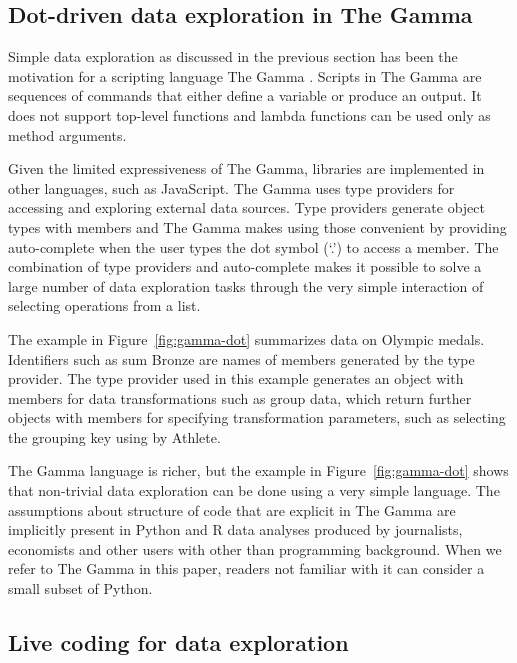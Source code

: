 \documentclass[english,submission]{programming}
\theoremstyle{plain}
\theoremstyle{definition}
\newcommand{\qident}[1]{\textnormal{\sffamily \textquotesingle #1\textquotesingle}}
\begin{document}

\subsection{Dot-driven data exploration in The Gamma}
\label{sec:background-gamma}

Simple data exploration as discussed in the previous section has been the motivation for
a scripting language The Gamma \cite{gamma}. Scripts in The Gamma are sequences of commands
that either define a variable or produce an output. It does not support top-level
functions and lambda functions can be used only as method arguments.

Given the limited expressiveness of The Gamma, libraries are implemented in other languages,
such as JavaScript. The Gamma uses type providers \cite{providers-fsharp}
for accessing and exploring external data sources.
Type providers generate object types with members and The Gamma makes using those convenient by
providing auto-complete when the user types the dot symbol (`.') to access a member.
The combination of type providers and auto-complete makes it
possible to solve a large number of data exploration tasks through the very simple interaction of
selecting operations from a list.

The example in Figure~\ref{fig:gamma-dot} summarizes data on Olympic medals. Identifiers such
as \qident{sum Bronze} are names of members generated by the type provider. The type provider
used in this example generates an object with members for data transformations such as
\qident{group data}, which return further objects with members for specifying transformation
parameters, such as selecting the grouping key using \qident{by Athlete}.

The Gamma language is richer, but the example in Figure~\ref{fig:gamma-dot} shows that non-trivial
data exploration can be done using a very simple language. The assumptions about structure of
code that are explicit in The Gamma are implicitly present in Python and R data analyses
produced by journalists, economists and other users with other than programming background.
When we refer to The Gamma in this paper, readers not familiar with it can consider a small
subset of Python.


\subsection{Live coding for data exploration}
\end{document}
